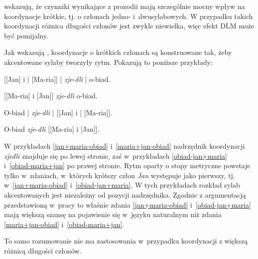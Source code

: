 \cite{wright2005ladies} wskazują, że czynniki wynikające z prozodii mają szczególnie mocny wpływ na koordynacje krótkie, tj. o członach jedno- i~dwusylabowych. W przypadku takich koordynacji różnica długości członów jest zwykle niewielka, więc efekt DLM może być pomijalny.

Jak wskazują \cite{mcdonald1993word}, koordynacje o krótkich członach są konstruowane tak, żeby akcentowane sylaby tworzyły rytm. Pokazują to poniższe przykłady:

\begin{exe}
\ex \label{jan+maria-obiad} {
        {[[Jan] i | [Ma-ria]] |  \textit{zje}-\textit{dli} | o-biad.}
        }
        
\ex \label{maria+jan-obiad} {
        {[[Ma-ria] i [Jan]] \textit{zje}-\textit{dli} o-biad.}
        }
        
\ex \label{obiad-jan+maria} {
        {O-biad | \textit{zje}-\textit{dli} | [[Jan] i | [Ma-ria]].}
        }

\ex \label{obiad-maria+jan} {
        {O-biad \textit{zje}-\textit{dli} [[Ma-ria] i [Jan]].}
        }
\end{exe}
        
W przykładach \eqref{jan+maria-obiad} i~\eqref{maria+jan-obiad} nadrzędnik koordynacji \textit{zjedli} znajduje się po lewej stronie, zaś w~przykładach \eqref{obiad-jan+maria} i~\eqref{obiad-maria+jan} po prawej stronie. Rytm oparty o stopy metryczne powstaje tylko w~zdaniach, w~których krótszy człon \textit{Jan} występuje jako pierwszy, tj. w~\eqref{jan+maria-obiad} i~\eqref{obiad-jan+maria}. W tych przykładach rozkład sylab akcentowanych jest niezależny od pozycji nadrzędnika. Zgodnie z argumentacją przedstawioną w~pracy \cite{mcdonald1993word} to właśnie zdania \eqref{jan+maria-obiad} i~\eqref{obiad-jan+maria} mają większą szansę na pojawienie się w~języku naturalnym niż zdania \eqref{maria+jan-obiad} i~\eqref{obiad-maria+jan}.

To samo rozumowanie nie ma zastosowania w~przypadku koordynacji z większą różnicą długości członów.

